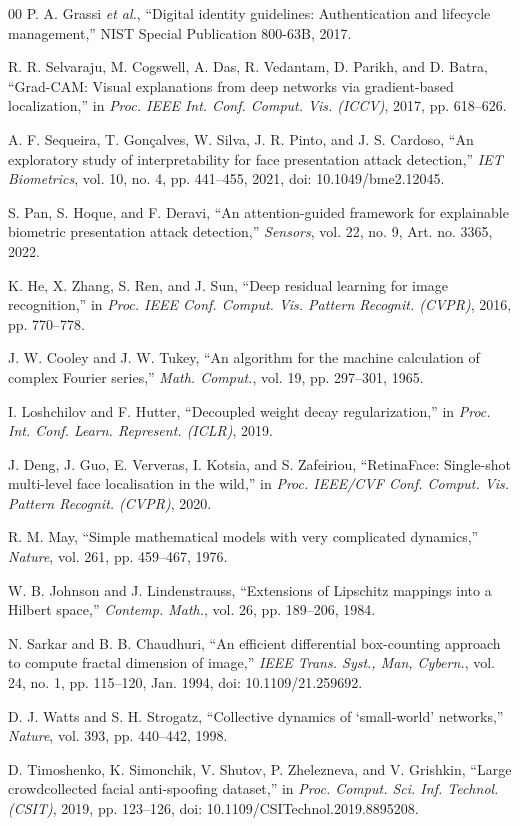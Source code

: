 \documentclass{ieeeaccess}
\begin{document}
\begin{thebibliography}{00}
 P. A. Grassi \emph{et al.}, ``Digital identity guidelines: Authentication and
lifecycle management,'' NIST Special Publication 800-63B, 2017.

 R. R. Selvaraju, M. Cogswell, A. Das, R. Vedantam, D. Parikh, and D. Batra,
``Grad-CAM: Visual explanations from deep networks via gradient-based localization,'' in \emph{Proc.
IEEE Int. Conf. Comput. Vis. (ICCV)}, 2017, pp. 618--626.

 A. F. Sequeira, T. Gon\c{c}alves, W. Silva, J. R. Pinto, and J. S. Cardoso,
``An exploratory study of interpretability for face presentation attack detection,'' \emph{IET
Biometrics}, vol. 10, no. 4, pp. 441--455, 2021, doi: 10.1049/bme2.12045.

 S. Pan, S. Hoque, and F. Deravi, ``An attention-guided framework for explainable
biometric presentation attack detection,'' \emph{Sensors}, vol. 22, no. 9, Art. no. 3365, 2022.

 K. He, X. Zhang, S. Ren, and J. Sun, ``Deep residual learning for image
recognition,'' in \emph{Proc. IEEE Conf. Comput. Vis. Pattern Recognit. (CVPR)}, 2016, pp. 770--778.

 J. W. Cooley and J. W. Tukey, ``An algorithm for the machine calculation of complex
Fourier series,'' \emph{Math. Comput.}, vol. 19, pp. 297--301, 1965.

 I. Loshchilov and F. Hutter, ``Decoupled weight decay regularization,'' in \emph{Proc.
Int. Conf. Learn. Represent. (ICLR)}, 2019.

 J. Deng, J. Guo, E. Ververas, I. Kotsia, and S. Zafeiriou, ``RetinaFace:
Single-shot multi-level face localisation in the wild,'' in \emph{Proc. IEEE/CVF Conf. Comput. Vis.
Pattern Recognit. (CVPR)}, 2020.

 R. M. May, ``Simple mathematical models with very complicated dynamics,''
\emph{Nature}, vol. 261, pp. 459--467, 1976.

 W. B. Johnson and J. Lindenstrauss, ``Extensions of Lipschitz mappings into a Hilbert
space,'' \emph{Contemp. Math.}, vol. 26, pp. 189--206, 1984.

 N. Sarkar and B. B. Chaudhuri, ``An efficient differential box-counting approach
to compute fractal dimension of image,'' \emph{IEEE Trans. Syst., Man, Cybern.}, vol. 24, no. 1,
pp. 115--120, Jan. 1994, doi: 10.1109/21.259692.

 D. J. Watts and S. H. Strogatz, ``Collective dynamics of `small-world' networks,''
\emph{Nature}, vol. 393, pp. 440--442, 1998.

 D. Timoshenko, K. Simonchik, V. Shutov, P. Zhelezneva, and V. Grishkin, ``Large
crowdcollected facial anti-spoofing dataset,'' in \emph{Proc. Comput. Sci. Inf. Technol. (CSIT)}, 2019,
pp. 123--126, doi: 10.1109/CSITechnol.2019.8895208.

\end{thebibliography}
\end{document}
